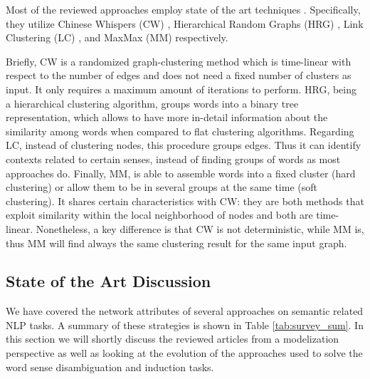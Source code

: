 Most of the reviewed approaches employ state of the art techniques \cite{2008.Klapaftis.WSIUsingCollocations,2010.Klapaftis.WSD.WSD.HierarchicalGraphs,2011.Jurgens.WSICommunityDetection,2013.Hope.GradedWSI}. Specifically, they utilize Chinese Whispers (CW) \cite{biemann2006chinese}, Hierarchical Random Graphs (HRG) \cite{clauset2008hierarchical}, Link Clustering (LC) \cite{ahn2010link}, and MaxMax (MM) \cite{hope2013maxmax} respectively. 

Briefly, CW is a randomized graph-clustering method  which is time-linear with respect to the number of edges and does not need a fixed number of clusters as input. It only requires a maximum amount of iterations to perform. HRG, being a hierarchical clustering algorithm, groups words into a binary tree representation, which allows to have more in-detail information about the similarity among words when compared to flat clustering algorithms. Regarding LC, instead of clustering nodes, this procedure groups edges. Thus it can identify contexts related to certain senses, instead of finding groups of words as most approaches do. Finally, MM, is able to assemble words into a fixed cluster (hard clustering) or allow them to be in several groups at the same time (soft clustering). It shares certain characteristics with CW:  they are both methods that exploit similarity within the local neighborhood of nodes and both are time-linear. Nonetheless, a key difference is that CW is not deterministic, while MM is, thus MM will find always the same clustering result for the same input graph.



\subsection{State of the Art Discussion}\label{sec:soa_disc}
We have covered the network attributes of several approaches on semantic related NLP tasks. A summary of these strategies is shown in Table \ref{tab:survey_sum}.
In this section we will shortly discuss the reviewed articles from a  modelization perspective as well as looking at the evolution of the approaches used to solve the word sense disambiguation and induction tasks.


